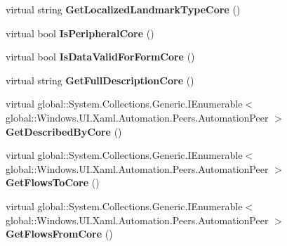 \begin{DoxyCompactItemize}
virtual string {\bfseries Get\+Localized\+Landmark\+Type\+Core} ()
\item 
\mbox{\label{class_windows_1_1_u_i_1_1_xaml_1_1_automation_1_1_peers_1_1_automation_peer_a5868d299d4d9698f50f5f3af851f85d2}} 
virtual bool {\bfseries Is\+Peripheral\+Core} ()
\item 
\mbox{\label{class_windows_1_1_u_i_1_1_xaml_1_1_automation_1_1_peers_1_1_automation_peer_a375e173803947dba5bb2ee40016d54e9}} 
virtual bool {\bfseries Is\+Data\+Valid\+For\+Form\+Core} ()
\item 
\mbox{\label{class_windows_1_1_u_i_1_1_xaml_1_1_automation_1_1_peers_1_1_automation_peer_a03e2b030728b5480baca09928e51811f}} 
virtual string {\bfseries Get\+Full\+Description\+Core} ()
\item 
\mbox{\label{class_windows_1_1_u_i_1_1_xaml_1_1_automation_1_1_peers_1_1_automation_peer_af229ab1160fae56261351af4e4f4e4ab}} 
virtual global\+::\+System.\+Collections.\+Generic.\+I\+Enumerable$<$ global\+::\+Windows.\+U\+I.\+Xaml.\+Automation.\+Peers.\+Automation\+Peer $>$ {\bfseries Get\+Described\+By\+Core} ()
\item 
\mbox{\label{class_windows_1_1_u_i_1_1_xaml_1_1_automation_1_1_peers_1_1_automation_peer_a539ef8ed84355a4ed89c67cfc12b13cb}} 
virtual global\+::\+System.\+Collections.\+Generic.\+I\+Enumerable$<$ global\+::\+Windows.\+U\+I.\+Xaml.\+Automation.\+Peers.\+Automation\+Peer $>$ {\bfseries Get\+Flows\+To\+Core} ()
\item 
\mbox{\label{class_windows_1_1_u_i_1_1_xaml_1_1_automation_1_1_peers_1_1_automation_peer_af28cc07b8f441e466107608f74339c8f}} 
virtual global\+::\+System.\+Collections.\+Generic.\+I\+Enumerable$<$ global\+::\+Windows.\+U\+I.\+Xaml.\+Automation.\+Peers.\+Automation\+Peer $>$ {\bfseries Get\+Flows\+From\+Core} ()
\item 

\end{DoxyCompactItemize}
